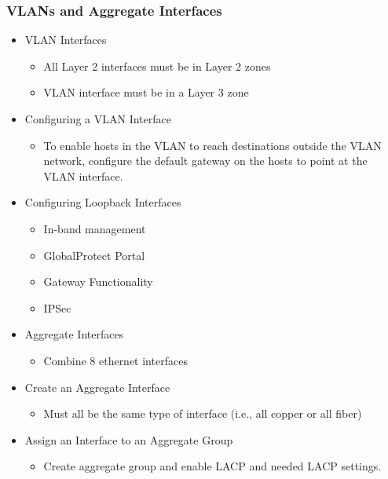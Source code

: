 \subsubsection{VLANs and Aggregate Interfaces}
    \begin{itemize}
        \item VLAN Interfaces
            \begin{itemize}
                \item All Layer 2 interfaces must be in Layer 2 zones
                \item VLAN interface must be in a Layer 3 zone
            \end{itemize}
        \item Configuring a VLAN Interface
            \begin{itemize}
                \item To enable hosts in the VLAN to reach destinations outside the VLAN network, configure the default gateway on the hosts to point at the VLAN interface.
            \end{itemize}
        \item Configuring Loopback Interfaces
            \begin{itemize}
                \item In-band management
                \item GlobalProtect Portal
                \item Gateway Functionality
                \item IPSec
            \end{itemize}
        \item Aggregate Interfaces
            \begin{itemize}
                \item Combine 8 ethernet interfaces
            \end{itemize}
        \item Create an Aggregate Interface
            \begin{itemize}
                \item Must all be the same type of interface (i.e., all copper or all fiber)
            \end{itemize}
        \item Assign an Interface to an Aggregate Group
            \begin{itemize}
                \item Create aggregate group and enable LACP and needed LACP settings.
            \end{itemize}
    \end{itemize}
    
    
    
    
    
    
    
    
    
    
    
    
    
    
    
    
    
    
    
    
    
%